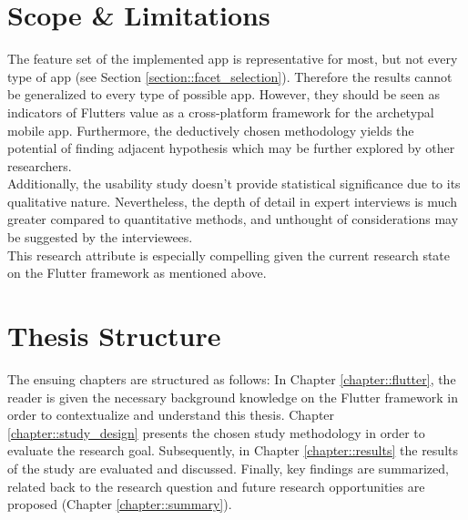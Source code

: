 \section{Scope \& Limitations}
The feature set of the implemented app is representative for most, but not every type of app (see Section \ref{section::facet_selection}). 
Therefore the results cannot be generalized to every type of possible app. 
However, they should be seen as indicators of Flutters value as a cross-platform framework for the 
archetypal mobile app. 
Furthermore, the deductively chosen methodology yields the potential of finding adjacent hypothesis which may be
further explored by other researchers.\\
Additionally, the usability study doesn't provide statistical significance due to its qualitative nature. Nevertheless, the depth of detail
in expert interviews is much greater compared to quantitative methods, and unthought of considerations may be suggested by the interviewees.\\
This research attribute is especially compelling given the current research state on the Flutter framework as mentioned above. 

\section{Thesis Structure}
The ensuing chapters are structured as follows:
In Chapter \ref{chapter::flutter}, the reader is given the necessary background knowledge on the Flutter framework in order to contextualize and understand this thesis. Chapter \ref{chapter::study_design} presents the chosen study methodology in order to evaluate the research goal. 
Subsequently, in Chapter \ref{chapter::results} the results of the study are evaluated and discussed.
Finally, key findings are summarized, related back to the research question and future research opportunities are proposed (Chapter \ref{chapter::summary}).
